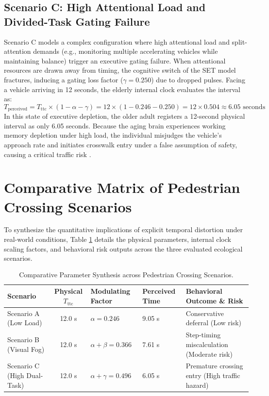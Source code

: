 \documentclass{custom_report}
\begin{document}
\subsection{Scenario C: High Attentional Load and Divided-Task Gating Failure}
Scenario C models a complex configuration where high attentional load and split-attention demands (e.g., monitoring multiple accelerating vehicles while maintaining balance) trigger an executive gating failure. When attentional resources are drawn away from timing, the cognitive switch of the SET model fractures, inducing a gating loss factor ($\gamma = 0.250$) due to dropped pulses. Facing a vehicle arriving in 12 seconds, the elderly internal clock evaluates the interval as:
\begin{equation}
    T_{\text{perceived}} = T_{\text{ttc}} \times (1 - \alpha - \gamma) = 12 \times (1 - 0.246 - 0.250) = 12 \times 0.504 \approx 6.05\text{ seconds}
\end{equation}
In this state of executive depletion, the older adult registers a 12-second physical interval as only 6.05 seconds. Because the aging brain experiences working memory depletion under high load, the individual misjudges the vehicle's approach rate and initiates crosswalk entry under a false assumption of safety, causing a critical traffic risk \cite{Zivotofsky2012}.

\section{Comparative Matrix of Pedestrian Crossing Scenarios}
To synthesize the quantitative implications of explicit temporal distortion under real-world conditions, Table \ref{tab:scenario_comparison} details the physical parameters, internal clock scaling factors, and behavioral risk outputs across the three evaluated ecological scenarios.

\begin{table}[htbp]
\centering
\small
\begin{tabular}{|p{2.8cm}|c|p{2.5cm}|p{2.2cm}|p{3.8cm}|}
\hline
\textbf{Scenario} & \textbf{Physical $T_{\text{ttc}}$} & \textbf{Modulating Factor} & \textbf{Perceived Time} & \textbf{Behavioral Outcome \& Risk} \\ \hline
Scenario A (Low Load) & 12.0 s & $\alpha = 0.246$ & 9.05 s & Conservative deferral (Low risk) \\ \hline
Scenario B (Visual Fog) & 12.0 s & $\alpha + \beta = 0.366$ & 7.61 s & Step-timing miscalculation (Moderate risk) \\ \hline
Scenario C (High Dual-Task) & 12.0 s & $\alpha + \gamma = 0.496$ & 6.05 s & Premature crossing entry (High traffic hazard) \\ \hline
\end{tabular}
\caption{Comparative Parameter Synthesis across Pedestrian Crossing Scenarios.}
\label{tab:scenario_comparison}
\end{table}
\end{document}
